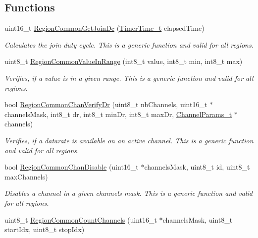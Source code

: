 \subsection*{Functions}
\begin{DoxyCompactItemize}
\item 
uint16\+\_\+t \hyperlink{group__REGIONCOMMON_ga672466fcf1aedaaf075cdabf49bc0c28}{Region\+Common\+Get\+Join\+Dc} (\hyperlink{utilities_8h_a4215ca43d3e953099ea758ce428599d0}{Timer\+Time\+\_\+t} elapsed\+Time)
\begin{DoxyCompactList}\small\item\em Calculates the join duty cycle. This is a generic function and valid for all regions. \end{DoxyCompactList}\item 
uint8\+\_\+t \hyperlink{group__REGIONCOMMON_gafdd1c80d953e18d755a631b72a9c3bd3}{Region\+Common\+Value\+In\+Range} (int8\+\_\+t value, int8\+\_\+t min, int8\+\_\+t max)
\begin{DoxyCompactList}\small\item\em Verifies, if a value is in a given range. This is a generic function and valid for all regions. \end{DoxyCompactList}\item 
bool \hyperlink{group__REGIONCOMMON_ga94ce5c6e759081853eb06d1dcffdab25}{Region\+Common\+Chan\+Verify\+Dr} (uint8\+\_\+t nb\+Channels, uint16\+\_\+t $\ast$channels\+Mask, int8\+\_\+t dr, int8\+\_\+t min\+Dr, int8\+\_\+t max\+Dr, \hyperlink{group__LORAMAC_ga1360ca6f82c6d125ea43a9dad9b56184}{Channel\+Params\+\_\+t} $\ast$channels)
\begin{DoxyCompactList}\small\item\em Verifies, if a datarate is available on an active channel. This is a generic function and valid for all regions. \end{DoxyCompactList}\item 
bool \hyperlink{group__REGIONCOMMON_ga695c0ab2a06edcae5b33772f639fb676}{Region\+Common\+Chan\+Disable} (uint16\+\_\+t $\ast$channels\+Mask, uint8\+\_\+t id, uint8\+\_\+t max\+Channels)
\begin{DoxyCompactList}\small\item\em Disables a channel in a given channels mask. This is a generic function and valid for all regions. \end{DoxyCompactList}\item 
uint8\+\_\+t \hyperlink{group__REGIONCOMMON_gac23f0831812f610f57f42f6cf87368c9}{Region\+Common\+Count\+Channels} (uint16\+\_\+t $\ast$channels\+Mask, uint8\+\_\+t start\+Idx, uint8\+\_\+t stop\+Idx)

\end{DoxyCompactItemize}
